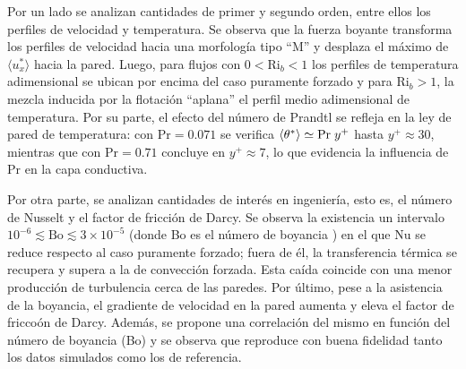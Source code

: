 Por un lado se analizan cantidades de primer y segundo orden, entre ellos los perfiles de velocidad y temperatura. Se observa que la fuerza boyante transforma los perfiles de velocidad hacia una morfología tipo “M” y desplaza el máximo de $\langle u_x^* \rangle$ hacia la pared. Luego, para flujos con $0 < \text{Ri}_b < 1$ los perfiles de temperatura adimensional se ubican por encima del caso puramente forzado y para $\text{Ri}_b>1$, la mezcla inducida por la flotación “aplana” el perfil medio adimensional de temperatura. Por su parte, el efecto del número de Prandtl se refleja en la ley de pared de temperatura: con $\text{Pr}=0\text{.}071$ se verifica $\langle \theta^{*} \rangle \simeq \text{Pr} \hspace{1mm} y^+$ hasta $y^+ \approx 30$, mientras que con $\text{Pr}=0\text{.}71$ concluye en $y^+ \approx 7$, lo que evidencia la influencia de $\text{Pr}$ en la capa conductiva. 

Por otra parte, se analizan cantidades de interés en ingeniería, esto es, el número de Nusselt y el factor de fricción de Darcy.  Se observa la existencia un intervalo $10^{-6} \lesssim \text{Bo} \lesssim 3\times10^{-5}$ (donde Bo es el número de boyancia \cite{jackson1989studies}) en el que $\text{Nu}$ se reduce respecto al caso puramente forzado; fuera de él, la transferencia térmica se recupera y supera a la de convección forzada. Esta caída coincide con una menor producción de turbulencia cerca de las paredes. Por último, pese a la asistencia de la boyancia, el gradiente de velocidad en la pared aumenta y eleva el factor de friccoón de Darcy. Además, se propone una correlación del mismo en función del número de boyancia (Bo) y se observa que reproduce con buena fidelidad tanto los datos simulados como los de referencia.



